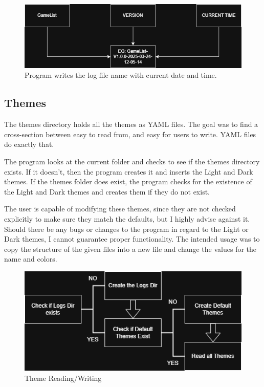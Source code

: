 \begin{figure}[htb]
	\centering
	\includegraphics[width=14cm]{./Images/Logging.png}
	\caption{Program writes the log file name with current date and time.}
	\label{fig:Logging}
\end{figure}

\subsection{Themes}

The themes directory holds all the themes as YAML files. The goal was
to find a cross-section between easy to read from, and easy for users
to write. YAML files do exactly that.

The program looks at the current folder and checks to see if the
themes directory exists. If it doesn't, then the program creates it and
inserts the Light and Dark themes. If the themes folder does exist,
the program checks for the existence of the Light and Dark themes and creates
them if they do not exist.

The user is capable of modifying these themes, since they are not
checked explicitly to make sure they match the defaults, but I highly
advise against it. Should there be any bugs or changes to the
program in regard to the Light or Dark themes, I cannot guarantee proper
functionality. The intended usage was to copy the structure of the
given files into a new file and change the values for the name and colors.

\begin{figure}[htbp]
	\centering
	\includegraphics[width=14cm]{./Images/Themes.png}
	\caption{Theme Reading/Writing}
	\label{fig:ThemeReadWrite}
\end{figure}

